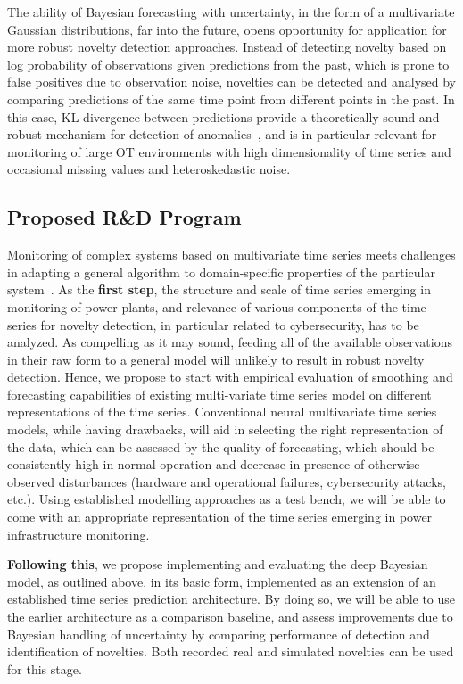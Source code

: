 \documentclass{paper}
\begin{document}
The ability of Bayesian forecasting with uncertainty, in the form of a multivariate Gaussian distributions, far into the future, opens opportunity for application for more robust novelty detection
approaches. Instead of detecting novelty based on log probability of observations given predictions from the past, which is prone to false positives due to observation noise, novelties can be detected and analysed by comparing predictions of the same time point from different points in the past. In this case, KL-divergence between predictions provide a theoretically sound and robust mechanism for detection of anomalies~\cite{10.1145/3297280.3297414}, and is in particular relevant for monitoring of large OT environments with high dimensionality of time series and occasional missing values and heteroskedastic noise.

\subsection{Proposed R\&D Program}

Monitoring of complex systems based on multivariate time series meets challenges in adapting a general algorithm to  domain-specific properties of the particular system~\cite{DBLP:conf/iccst/DymshitsMT17}. As the \textbf{first step}, the structure and scale of time series emerging in monitoring of power plants, and relevance of various components of the time series for novelty detection, in particular related to cybersecurity, has to be analyzed. As compelling as it may sound, feeding all of the available observations in their raw form to a general model will unlikely to result in robust novelty detection. Hence, we propose to start with empirical evaluation of smoothing and forecasting capabilities of existing multi-variate time series model on different representations of the time series. Conventional neural multivariate time series models, while having drawbacks, will aid in selecting the right representation of the data, which can be assessed by the quality of forecasting, which should be consistently high in normal operation and decrease in presence of otherwise observed disturbances (hardware and operational failures, cybersecurity attacks, etc.). Using established modelling approaches as a test bench, we will be able to come with an appropriate representation of the time series emerging in power infrastructure monitoring.

\textbf{Following this}, we propose implementing and evaluating the deep Bayesian model, as outlined above, in its basic form, implemented as an extension of an established time series prediction architecture. By doing so, we will be able to use the earlier architecture as a comparison baseline, and assess improvements due to Bayesian handling of uncertainty by comparing performance of detection and identification of novelties. Both recorded real and simulated novelties can be used for this stage.
\end{document}
